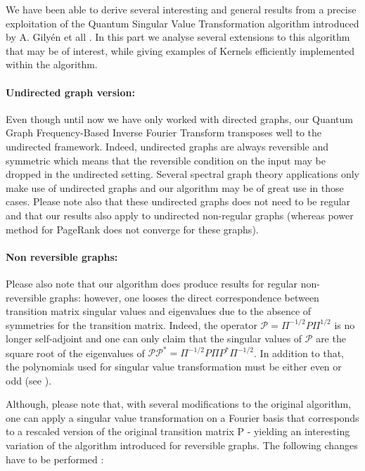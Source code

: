 \documentclass[sn-mathphys]{sn-jnl}%
\theoremstyle{thmstyleone}%
\theoremstyle{thmstyletwo}%
\theoremstyle{thmstylethree}%
\begin{document}
We have been able to derive several interesting and general results
from a precise exploitation of the Quantum Singular Value
Transformation algorithm introduced by A. Gilyén et all
\cite{gilyen_su_low_wiebe_2019}. In this part we analyse several
extensions to this algorithm that may be of interest, while giving
examples of Kernels efficiently implemented within the algorithm.

\paragraph{Undirected graph version:}
Even though until now we have only worked with directed graphs, our
Quantum Graph Frequency-Based Inverse Fourier Transform transposes
well to the undirected framework. Indeed, undirected graphs are always
reversible and symmetric which means that the reversible condition on
the input may be dropped in the undirected setting. Several spectral
graph theory applications only make use of undirected graphs
\cite{ortega_frossard_kovacevic_moura_vandergheynst_2018,
  shuman_narang_frossard_ortega_vandergheynst_2013,
  ricaud_borgnat_tremblay_goncalves_vandergheynst_2019} and our
algorithm may be of great use in those cases. Please note also that
these undirected graphs does not need to be regular and that our
results also apply to undirected non-regular graphs (whereas power
method for PageRank does not converge for these graphs).

\paragraph{Non reversible graphs:}
Please also note that our algorithm does produce results for regular
non-reversible graphs: however, one looses the direct correspondence
between transition matrix singular values and eigenvalues due to the
absence of symmetries for the transition matrix. Indeed, the operator
$\mathcal{P} = \Pi^{-1/2} P \Pi^{1/2}$ is no longer self-adjoint and
one can only claim that the singular values of $\mathcal{P}$ are the
square root of the eigenvalues of
$\mathcal{P}\mathcal{P}^* = \Pi^{-1/2} P \Pi P^* \Pi^{-1/2}$. In addition to that, the polynomials used for singular value transformation must be either even or odd (see \cite{gilyen_su_low_wiebe_2019}).

Although, please note that, with several modifications to the original
algorithm, one can apply a singular value transformation on a Fourier
basis that corresponds to a rescaled version of the original
transition matrix P - yielding an interesting variation of the algorithm introduced for reversible graphs. The following changes have to be performed :
\end{document}
